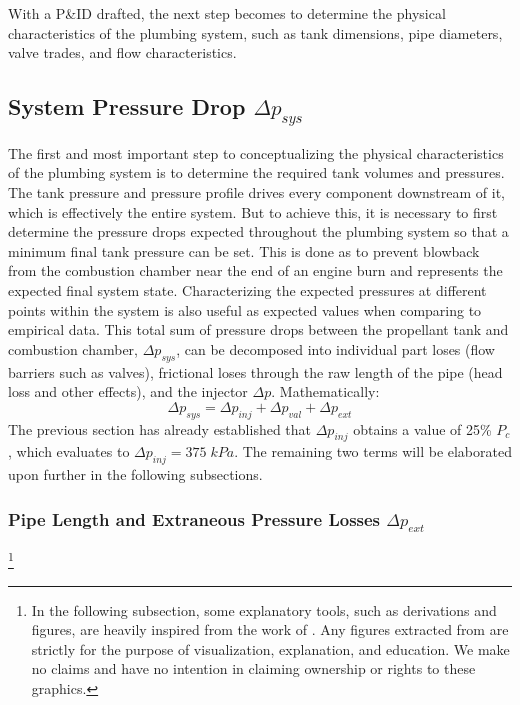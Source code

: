 \documentclass[9pt]{article} %
\numberwithin{equation}{section} %
\begin{document}
With a P\&ID drafted, the next step becomes to determine the physical characteristics of the plumbing system, such as tank dimensions, pipe diameters, valve trades, and flow characteristics.

\subsection{System Pressure Drop $\Delta p_{sys}$}

\hspace{\parindent} The first and most important step to conceptualizing the physical characteristics of the plumbing system is to determine the required tank volumes and pressures. The tank pressure and pressure profile drives every component downstream of it, which is effectively the entire system. But to achieve this, it is necessary to first determine the pressure drops expected throughout the plumbing system so that a minimum final tank pressure can be set. This is done as to prevent blowback from the combustion chamber near the end of an engine burn and represents the expected final system state. Characterizing the expected pressures at different points within the system is also useful as expected values when comparing to empirical data. This total sum of pressure drops between the propellant tank and combustion chamber, $\Delta p_{sys}$, can be decomposed into individual part loses (flow barriers such as valves), frictional loses through the raw length of the pipe (head loss and other effects), and the injector $\Delta p$. Mathematically:
\begin{equation} \label{eq:system_pressure_drop}
\Delta p_{sys} = \Delta p_{inj} + \Delta p_{val} + \Delta p_{ext}
\end{equation}
The previous section has already established that $\Delta p_{inj}$ obtains a value of 25\% $P_{c}$, which evaluates to $\Delta p_{inj} = 375 \; kPa$. The remaining two terms will be elaborated upon further in the following subsections.

\subsubsection{Pipe Length and Extraneous Pressure Losses $\Delta p_{ext}$} \footnote{In the following subsection, some explanatory tools, such as derivations and figures, are heavily inspired from the work of \cite{fluid-mechanics}. Any figures extracted from \cite{fluid-mechanics} are strictly for the purpose of visualization, explanation, and education. We make no claims and have no intention in claiming ownership or rights to these graphics.}
\end{document}
